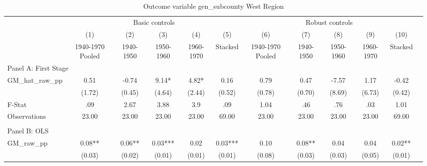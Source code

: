  \begin{table}[htbp]\centering {} \begin{threeparttable} \caption{Outcome variable gen\_subcounty West Region} \begin{tabular}{l*{11}{c}} \toprule
          &\multicolumn{5}{c}{Basic controls}                                   &\multicolumn{5}{c}{Robust controls}                                  \\\cmidrule(lr){2-6}\cmidrule(lr){7-11}
          &\multicolumn{1}{c}{(1)}&\multicolumn{1}{c}{(2)}&\multicolumn{1}{c}{(3)}&\multicolumn{1}{c}{(4)}&\multicolumn{1}{c}{(5)}&\multicolumn{1}{c}{(6)}&\multicolumn{1}{c}{(7)}&\multicolumn{1}{c}{(8)}&\multicolumn{1}{c}{(9)}&\multicolumn{1}{c}{(10)}\\
          &\multicolumn{1}{c}{1940-1970 Pooled}&\multicolumn{1}{c}{1940-1950}&\multicolumn{1}{c}{1950-1960}&\multicolumn{1}{c}{1960-1970}&\multicolumn{1}{c}{Stacked}&\multicolumn{1}{c}{1940-1970 Pooled}&\multicolumn{1}{c}{1940-1950}&\multicolumn{1}{c}{1950-1960}&\multicolumn{1}{c}{1960-1970}&\multicolumn{1}{c}{Stacked}\\
\cmidrule(lr){1-11}
\multicolumn{10}{l}{Panel A: First Stage}\\
\cmidrule(lr){1-11}
GM\_hat\_raw\_pp&      0.51   &     -0.74   &      9.14*  &      4.82*  &      0.16   &      0.79   &      0.47   &     -7.57   &      1.17   &     -0.42   \\
          &    (1.72)   &    (0.45)   &    (4.64)   &    (2.44)   &    (0.52)   &    (0.78)   &    (0.70)   &    (8.69)   &    (6.73)   &    (0.42)   \\
\midrule
F-Stat    &       .09   &      2.67   &      3.88   &       3.9   &       .09   &      1.04   &       .46   &       .76   &       .03   &      1.01   \\
Observations&     23.00   &     23.00   &     23.00   &     23.00   &     69.00   &     23.00   &     23.00   &     23.00   &     23.00   &     69.00   \\
\cmidrule[\heavyrulewidth](lr){1-11} \\ \cmidrule[\heavyrulewidth](lr){1-11}
\multicolumn{10}{l}{Panel B: OLS}\\
\cmidrule(lr){1-11}
GM\_raw\_pp &      0.08** &      0.06** &      0.03***&      0.02   &      0.03***&      0.10   &      0.08** &      0.04   &      0.04   &      0.02** \\
          &    (0.03)   &    (0.02)   &    (0.01)   &    (0.01)   &    (0.01)   &    (0.08)   &    (0.03)   &    (0.03)   &    (0.05)   &    (0.01)   \\

\end{tabular}
\end{threeparttable}
\end{table}
